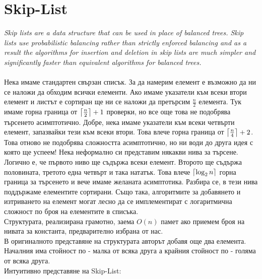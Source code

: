 \documentclass[a4paper,12pt,fleqn]{article}
\DeclarePairedDelimiter\ceil{\lceil}{\rceil}
\begin{document}
	\section{Skip-List}
	\textit{Skip lists are a data structure that can be used in place of balanced trees.
		Skip lists use probabilistic balancing rather than strictly enforced balancing
		and as a result the algorithms for insertion and deletion in skip lists are
		much simpler and significantly faster than equivalent algorithms for
		balanced trees.}\\
	\\Нека имаме стандартен свързан списък. За да намерим елемент е възможно да ни се наложи да обходим всички елементи. Ако имаме указатели към всеки втори елемент и листът е сортиран ще ни се наложи да претърсим $\frac{n}{2}$ елемента. Тук имаме горна граница от $\ceil*{\frac{n}{2}} + 1$ проверки, но все още това не подобрява търсенето асимптотично. Добре, нека имаме указатели към всеки четвърти елемент, запазвайки тези към всеки втори. Това влече горна граница от $\ceil*{\frac{n}{4}} + 2$. Това отново не подобрява сложността асимптотично, но ни води до друга идея с която ще успеем! Нека неформално си представим някакви нива за търсене. Логично е, че първото ниво ще съдържа всеки елемент. Второто ще съдържа половината, третото една четвърт и така нататък. Това влече $\ceil*{\log_2{n}}$ горна граница за търсенето и вече имаме желаната асимптотика. Разбира се, в тези нива поддържаме елементите сортирани. Също така, алгоритмите за добавянето и изтриването на елемент могат лесно да се имплементират с логаритмична сложност по броя на елементите в списъка.\\
	Структурата, реализирана грамотно, заема $O(n)$ памет ако приемем броя на нивата за константа, предварително избрана от нас.\\
	В оригиналното представяне на структурата авторът добавя още два елемента. Началния има стойност по - малка от всяка друга а крайния стойност по - голяма от всяка друга.\\
	Интуитивно представяне на Skip-List:
	
\end{document}

